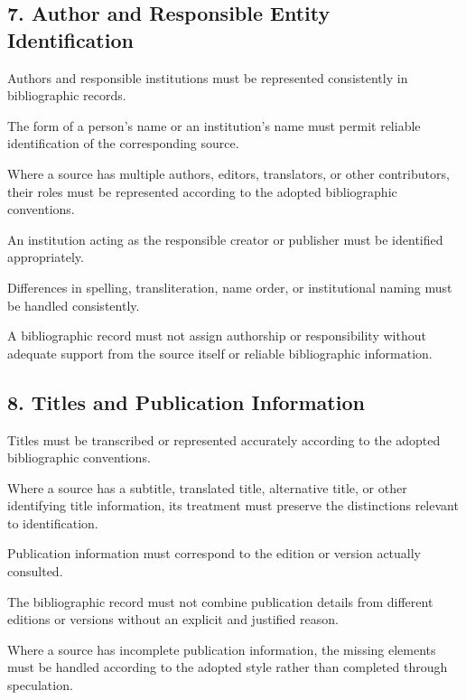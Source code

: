 \subsection*{7. Author and Responsible
Entity Identification}

Authors and responsible
institutions must be
represented consistently
in bibliographic records.

The form of a person's
name or an institution's
name must permit reliable
identification of the
corresponding source.

Where a source has multiple
authors, editors, translators,
or other contributors,
their roles must be
represented according
to the adopted bibliographic
conventions.

An institution acting
as the responsible creator
or publisher must be
identified appropriately.

Differences in spelling,
transliteration, name order,
or institutional naming
must be handled consistently.

A bibliographic record
must not assign authorship
or responsibility without
adequate support from
the source itself or
reliable bibliographic
information.


\subsection*{8. Titles and Publication Information}

Titles must be transcribed
or represented accurately
according to the adopted
bibliographic conventions.

Where a source has a
subtitle, translated title,
alternative title, or
other identifying title
information, its treatment
must preserve the
distinctions relevant
to identification.

Publication information
must correspond to the
edition or version
actually consulted.

The bibliographic record
must not combine publication
details from different
editions or versions
without an explicit
and justified reason.

Where a source has
incomplete publication
information, the missing
elements must be handled
according to the adopted
style rather than completed
through speculation.



